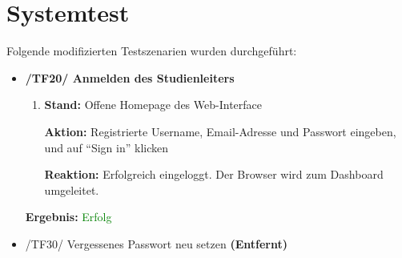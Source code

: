 \documentclass[a4paper]{scrreprt}
\begin{document}
	
	  \newpage
	  \chapter{Systemtest}
	  Folgende modifizierten Testszenarien wurden durchgef\"uhrt:
	   \begin{itemize}

		           \vspace*{0.3cm}
		           \par \textbf{Ergebnis: }\textcolor{green}{Erfolg}
		           \vspace*{0.6cm}
	
                    \item \textbf{/TF20/ Anmelden des Studienleiters}
                        \begin{enumerate}
                            \item \par \textbf{Stand: }Offene Homepage des Web-Interface
                                \par \textbf{Aktion: }Registrierte Username, Email-Adresse und Passwort eingeben, und auf “Sign in” klicken
                                \par \textbf{Reaktion: }Erfolgreich eingeloggt. Der Browser wird zum Dashboard umgeleitet.
                        \end{enumerate}		
		           \vspace*{0.3cm}
		           \par \textbf{Ergebnis: }\textcolor{green}{Erfolg}
		           \vspace*{0.6cm}
		
                \item /TF30/ Vergessenes Passwort neu setzen \textbf{(Entfernt)}
		        \vspace*{0.6cm}
		

\end{itemize}
\end{document}
